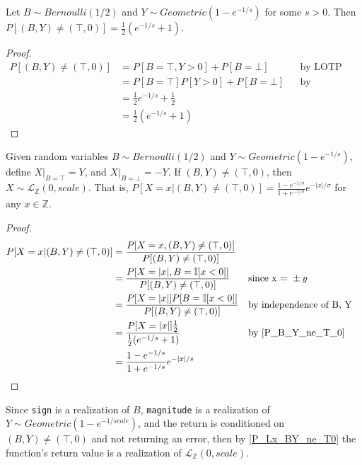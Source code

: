 \documentclass{article}
\begin{document}

\begin{lemma}
\label{P_B_Y_ne_T_0}
Let $B \sim Bernoulli(1/2)$ and $Y \sim Geometric(1 - e^{-1/s})$ for some $s > 0$. Then $P[(B, Y) \neq (\top, 0)] = \frac{1}{2} (e^{-1/s} + 1)$\cite{CKS20}.
\end{lemma}

\begin{proof}
\begin{align*}
    P[(B, Y) \neq (\top, 0)] &= P[B = \top, Y > 0] + P[B = \bot] && \text{by LOTP} \\
    &= P[B = \top] P[Y > 0] + P[B = \bot] && \text{by independence of B, Y} \\
    &= \frac{1}{2} e^{-1/s} + \frac{1}{2} \\
    &= \frac{1}{2} (e^{-1/s} + 1)
\end{align*}
\end{proof}

\begin{theorem}
\label{P_Lx_BY_ne_T0}
Given random variables $B \sim Bernoulli(1/2)$ and $Y \sim Geometric(1 - e^{-1/s})$, define $X|_{B=\top} = Y$, and $X|_{B=\bot} = -Y$. If $(B, Y) \neq (\top, 0)$, then $X \sim \mathcal{L}_\mathbb{Z}(0, scale)$. That is, $P[X = x | (B, Y) \neq (\top, 0)] = \frac{1 - e^{-1/\sigma}}{1 + e^{-1/\sigma}} e^{-|x|/\sigma}$ for any $x \in \mathbb{Z}$\cite{CKS20}.
\end{theorem}

\begin{proof}
\begin{align*}
P[X = x | (B, Y) \neq (\top, 0)] &= \frac{P[X = x, (B, Y) \neq (\top, 0)]}{P[(B, Y) \neq (\top, 0)]} \\
    &= \frac{P[X = |x|, B = \mathbb{I}[x < 0]]}{P[(B, Y) \neq (\top, 0)]} && \text{since x = }\pm y \\
    &= \frac{P[X = |x|] P[B = \mathbb{I}[x < 0]]}{P[(B, Y) \neq (\top, 0)]} && \text{by independence of B, Y} \\
    &= \frac{P[X = |x|] \frac{1}{2}}{\frac{1}{2} (e^{-1/s} + 1)} && \text{by } \ref{P_B_Y_ne_T_0} \\
    &= \frac{1 - e^{-1/s}}{1 + e^{-1/s}} e^{-|x|/s} \\
\end{align*}
\end{proof}

Since \texttt{sign} is a realization of $B$, \texttt{magnitude} is a realization of $Y \sim Geometric(1 - e^{-1/scale})$, and the return is conditioned on $(B, Y) \neq (\top, 0)$ and not returning an error, then by \ref{P_Lx_BY_ne_T0} the function's return value is a realization of $\mathcal{L}_\mathbb{Z}(0, scale)$.




\end{document}
